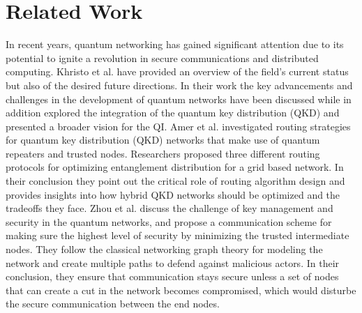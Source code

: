\documentclass[12pt]{ieeetj}
\begin{document}
\section{Related Work}
		In recent years, quantum networking has gained
		significant attention due to its potential to ignite a revolution in
		secure communications and distributed computing.
		Khristo et al. \cite{Khristo2020} have provided an overview of the field's
		current status but also of the desired future directions.
		In their work the key advancements and challenges in the
		development of quantum networks have been discussed while in addition
		explored the integration of the quantum key distribution (QKD)
		and presented a broader vision for the QI.
		Amer et al.\cite{amer-routing} investigated routing strategies for quantum key distribution (QKD) networks 
		that make use of quantum repeaters and trusted nodes. 
		Researchers proposed three different routing protocols for optimizing entanglement distribution 
		for a grid based network. In their conclusion they point out the critical role of routing algorithm design 
		and provides insights into how hybrid QKD networks should be optimized and the tradeoffs they face. 
		Zhou et al.\cite{qkd-zhou} discuss the challenge of key management and security in the quantum networks, 
		and propose a communication scheme for making sure the highest level of security by minimizing the trusted intermediate nodes.
		They follow the classical networking graph theory for modeling the network and create multiple paths to defend against malicious actors.
		In their conclusion, they ensure that communication stays secure unless a set of nodes that can create a cut in the network
		becomes compromised, which would disturbe the secure communication between the end nodes.
\end{document}
